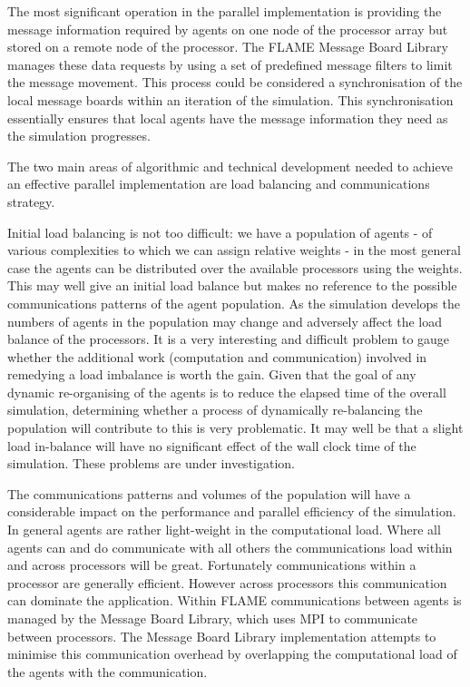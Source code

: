 The most significant operation in the parallel implementation is providing the message information required by agents on one node of the processor array but stored on a remote node of the processor. The FLAME Message Board Library manages these data requests by using a set of predefined message filters to limit the message movement. This process could be considered a synchronisation of the local message boards within an iteration of the simulation. This synchronisation essentially ensures that local agents have the message information they need as the simulation progresses.

The two main areas of algorithmic and technical development needed to achieve an effective parallel implementation are load balancing and communications strategy. 

Initial load balancing is not too difficult: we have a population of agents - of various complexities to which we can assign relative weights - in the most general case the agents can be distributed over the available processors using the weights. This may well give an initial load balance but makes no reference to the possible communications patterns of the agent population. As the simulation develops the numbers of agents in the population may change and adversely affect the load balance of the processors. It is a very interesting and difficult problem to gauge whether the additional work (computation and communication) involved in remedying a load imbalance  is worth the gain. Given that the goal of any dynamic re-organising of the agents is to reduce the elapsed time of the overall simulation, determining whether a process of dynamically re-balancing the population will contribute to this is very problematic. It may well be that a slight load in-balance will have no significant effect of the wall clock time of the simulation. These problems are under investigation.

The communications patterns and volumes of the population will have a considerable impact on the performance and parallel efficiency of the simulation. In general agents are rather light-weight in the computational load. Where all agents can and do communicate with all others the communications load within and across processors will be great. Fortunately communications within a processor are generally efficient. However across processors this communication can dominate the application. Within FLAME communications between agents is managed by the Message Board Library, which uses MPI to communicate between processors. The Message Board Library implementation attempts to minimise this communication overhead by overlapping the computational load of the agents with the communication. 

